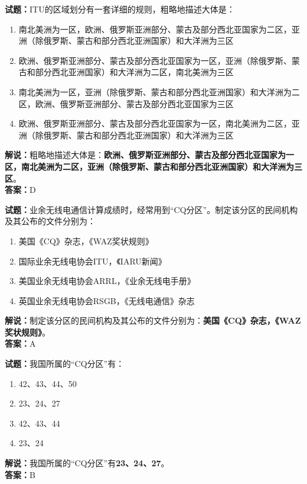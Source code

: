 \documentclass{ctexbook}
\begin{document}
\textbf{试题：}ITU的区域划分有一套详细的规则，粗略地描述大体是：
\begin{enumerate}[leftmargin=3em]
  \item 南北美洲为一区，欧洲、俄罗斯亚洲部分、蒙古及部分西北亚国家为二区，亚洲（除俄罗斯、蒙古和部分西北亚洲国家）和大洋洲为三区
  \item 欧洲、俄罗斯亚洲部分、蒙古及部分西北亚国家为一区，亚洲（除俄罗斯、蒙古和部分西北亚洲国家）和大洋洲为二区，南北美洲为三区%
  \item 南北美洲为一区，亚洲（除俄罗斯、蒙古和部分西北亚洲国家）和大洋洲为二区，欧洲、俄罗斯亚洲部分、蒙古及部分西北亚国家为三区
  \item 欧洲、俄罗斯亚洲部分、蒙古及部分西北亚国家为一区，南北美洲为二区，亚洲（除俄罗斯、蒙古和部分西北亚洲国家）和大洋洲为三区
\end{enumerate}
\noindent\textbf{解说：}粗略地描述大体是：\textbf{欧洲、俄罗斯亚洲部分、蒙古及部分西北亚国家为一区，南北美洲为二区，亚洲（除俄罗斯、蒙古和部分西北亚洲国家）和大洋洲为三区}。\\\noindent\textbf{答案：}D

\vspace{1em}

\textbf{试题：}业余无线电通信计算成绩时，经常用到“CQ分区”。制定该分区的民间机构及其公布的文件分别为：
\begin{enumerate}[leftmargin=3em]
  \item 美国《CQ》杂志，《WAZ奖状规则》
  \item 国际业余无线电协会ITU，《IARU新闻》
  \item 美国业余无线电协会ARRL，《业余无线电手册》
  \item 英国业余无线电协会RSGB，《无线电通信》杂志
\end{enumerate}
\noindent\textbf{解说：}制定该分区的民间机构及其公布的文件分别为：\textbf{美国《CQ》杂志，《WAZ奖状规则》}。\\\noindent\textbf{答案：}A

\vspace{1em}

\textbf{试题：}我国所属的“CQ分区”有：
\begin{enumerate}[leftmargin=3em]
  \item 42、43、44、50
  \item 23、24、27
  \item 42、43、44
  \item 23、24
\end{enumerate}
\noindent\textbf{解说：}我国所属的“CQ分区”有\textbf{23、24、27}。\\\noindent\textbf{答案：}B
\end{document}
